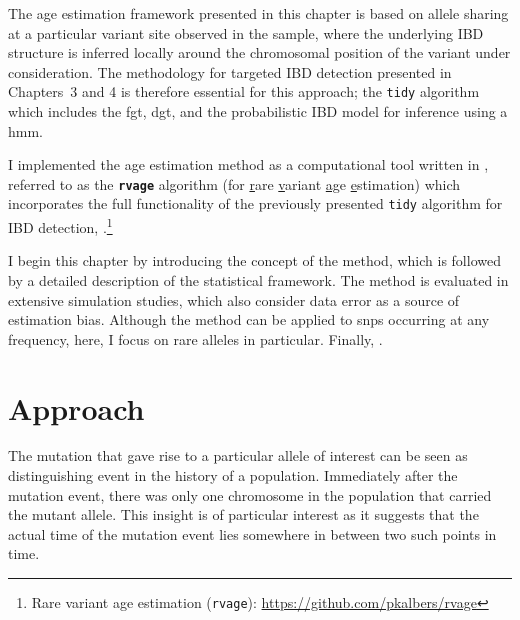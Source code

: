 The age estimation framework presented in this chapter is based on allele sharing at a particular variant site observed in the sample, where the underlying IBD structure is inferred locally around the chromosomal position of the variant under consideration.
The methodology for targeted IBD detection presented in Chapters~3 and 4 is therefore essential for this approach; \ie the \texttt{tidy} algorithm which includes the \gls{fgt}, \gls{dgt}, and the probabilistic IBD model for inference using a \gls{hmm}.

I implemented the age estimation method as a computational tool written in \cpp, referred to as the \textbf{\texttt{rvage}} algorithm (for \underline{r}are \underline{v}ariant \underline{a}\underline{g}e \underline{e}stimation) which incorporates the full functionality of the previously presented \texttt{tidy} algorithm for IBD detection, .\footnote{Rare variant age estimation (\texttt{rvage}): \url{https://github.com/pkalbers/rvage}}

I begin this chapter by introducing the concept of the method, which is followed by a detailed description of the statistical framework.
The method is evaluated in extensive simulation studies, which also consider data error as a source of estimation bias.
Although the method can be applied to \glspl{snp} occurring at any frequency, here, I focus on rare alleles in particular.
Finally, .



%
\section{Approach}
%

The mutation that gave rise to a particular allele of interest can be seen as distinguishing event in the history of a population.
Immediately after the mutation event, there was only one chromosome in the population that carried the mutant allele.
This insight is of particular interest as it suggests that the actual time of the mutation event lies somewhere in between two such points in time.

